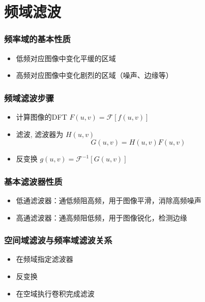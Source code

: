 \documentclass{beamer}
\begin{document}
\section{频域滤波}
\label{sec-5}
\begin{frame}
\frametitle{频率域的基本性质}
\label{sec-5-1}

\begin{itemize}
\item 低频对应图像中变化平缓的区域
\item 高频对应图像中变化剧烈的区域（噪声、边缘等）
\end{itemize}
\end{frame}
\begin{frame}
\frametitle{频域滤波步骤}
\label{sec-5-2}

\begin{itemize}
\item 计算图像的DFT $F(u,v)=\mathcal{F}[f(u,v)]$
\item 滤波, 滤波器为 $H(u,v)$
  \[G(u,v) = H(u,v) F(u,v)\]
\item 反变换  $g(u,v)=\mathcal{F}^{-1}[G(u,v)]$
\end{itemize}
\end{frame}
\begin{frame}
\frametitle{基本滤波器性质}
\label{sec-5-3}

\begin{itemize}
\item 低通滤波器：通低频阻高频，用于图像平滑，消除高频噪声
\item 高通滤波器：通高频阻低频，用于图像锐化，检测边缘
\end{itemize}
\end{frame}
\begin{frame}
\frametitle{空间域滤波与频率域滤波关系}
\label{sec-5-4}

\begin{itemize}
\item 在频域指定滤波器
\item 反变换
\item 在空域执行卷积完成滤波
\end{itemize}
\end{frame}
\end{document}
